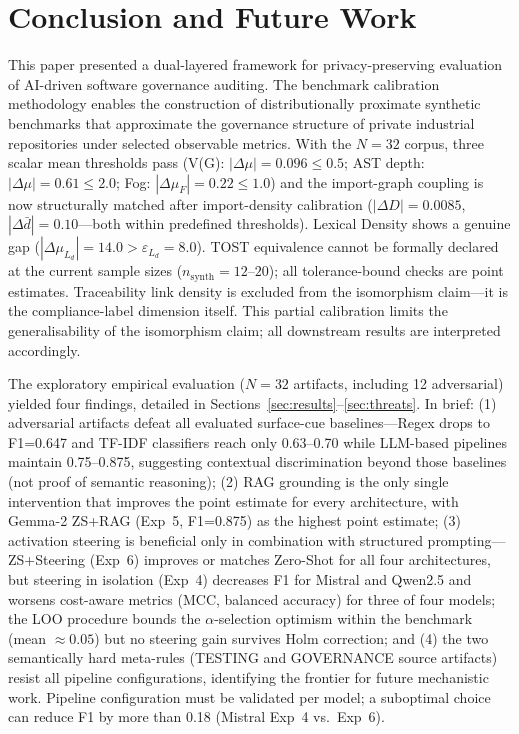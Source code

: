 \documentclass{ieeeaccess}
\begin{document}
\section{Conclusion and Future Work}
\label{sec:conclusion}

This paper presented a dual-layered framework for privacy-preserving evaluation of AI-driven software governance auditing. The benchmark calibration methodology enables the construction of distributionally proximate synthetic benchmarks that approximate the governance structure of private industrial repositories under selected observable metrics. With the $N=32$ corpus, three scalar mean thresholds pass (V(G): $|\Delta\mu|=0.096\leq0.5$; AST depth: $|\Delta\mu|=0.61\leq2.0$; Fog: $|\Delta\mu_F|=0.22\leq1.0$) and the import-graph coupling is now structurally matched after import-density calibration ($|\Delta D|=0.0085$, $|\Delta\bar{d}|=0.10$---both within predefined thresholds). Lexical Density shows a genuine gap ($|\Delta\mu_{L_d}|=14.0>\varepsilon_{L_d}=8.0$). TOST equivalence cannot be formally declared at the current sample sizes ($n_\text{synth}=12$--$20$); all tolerance-bound checks are point estimates. Traceability link density is excluded from the isomorphism claim---it is the compliance-label dimension itself. This partial calibration limits the generalisability of the isomorphism claim; all downstream results are interpreted accordingly.

The exploratory empirical evaluation ($N=32$ artifacts, including 12 adversarial) yielded four findings, detailed in Sections~\ref{sec:results}--\ref{sec:threats}. In brief: (1) adversarial artifacts defeat all evaluated surface-cue baselines---Regex drops to F1=0.647 and TF-IDF classifiers reach only 0.63--0.70 while LLM-based pipelines maintain 0.75--0.875, suggesting contextual discrimination beyond those baselines (not proof of semantic reasoning); (2) RAG grounding is the only single intervention that improves the point estimate for every architecture, with Gemma-2 ZS+RAG (Exp~5, F1=0.875) as the highest point estimate; (3) activation steering is beneficial only in combination with structured prompting---ZS+Steering (Exp~6) improves or matches Zero-Shot for all four architectures, but steering in isolation (Exp~4) decreases F1 for Mistral and Qwen2.5 and worsens cost-aware metrics (MCC, balanced accuracy) for three of four models; the LOO procedure bounds the $\alpha$-selection optimism within the benchmark (mean $\approx 0.05$) but no steering gain survives Holm correction; and (4) the two semantically hard meta-rules (TESTING and GOVERNANCE source artifacts) resist all pipeline configurations, identifying the frontier for future mechanistic work. Pipeline configuration must be validated per model; a suboptimal choice can reduce F1 by more than 0.18 (Mistral Exp~4 vs.\ Exp~6).
\end{document}
